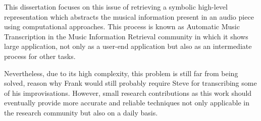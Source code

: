 This dissertation focuses on this issue of retrieving a symbolic high-level representation which abstracts the musical information present in an audio piece using computational approaches. This process is known as Automatic Music Transcription in the Music Information Retrieval community in which it shows large application, not only as a user-end application but also as an intermediate process for other tasks.

Nevertheless, due to its high complexity, this problem is still far from being solved, reason why Frank would still probably require Steve for transcribing some of his improvisations. However, small research contributions as this work should eventually provide more accurate and reliable techniques not only applicable in the research community but also on a daily basis.
